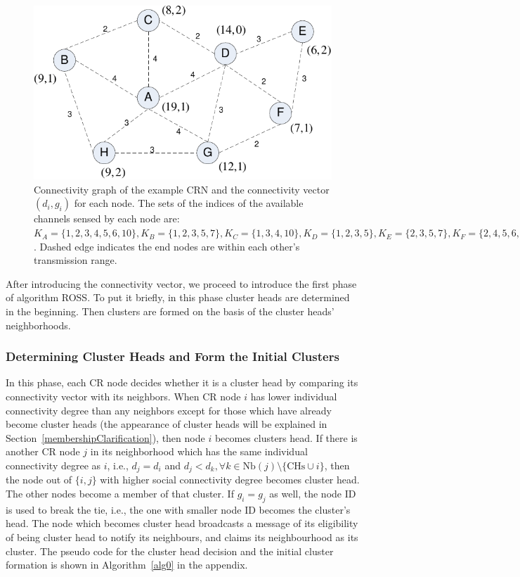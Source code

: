 \documentclass[10pt,journal,compsoc]{IEEEtran}
\theoremstyle{mytheoremstyle}
\theoremstyle{mytheoremstyle}
\theoremstyle{mytheoremstyle}
\newcommand{\ie}{i.e., }
\begin{document}
\begin{figure}[ht!]
  \centering
\includegraphics[width=0.7\linewidth]{figure1.pdf}
	\caption{Connectivity graph of the example CRN and the connectivity vector $(d_i, g_i)$ for each node. The sets of the indices of the available channels sensed by each node are: $K_A=\{1,2,3,4,5,6,10\}, K_B=\{1,2,3,5,7\}, K_C=\{1,3,4,10\}, K_D=\{1,2,3,5\}, K_E=\{2,3,5,7\}, K_F=\{2,4,5,6,7\}, K_G=\{1,2,3,4,8\}, K_H=\{1,2,5,8\}$. Dashed edge indicates the end nodes are within each other's transmission range.}
	\label{fig1}
\end{figure}

After introducing the connectivity vector, we proceed to introduce the first phase of algorithm ROSS.
To put it briefly, in this phase cluster heads are determined in the beginning. Then clusters are formed on the basis of the cluster heads' neighborhoods.


\subsubsection{Determining Cluster Heads and Form the Initial Clusters}
In this phase, each CR node decides whether it is a cluster head by comparing its connectivity vector with its neighbors.
When CR node $i$ has lower individual connectivity degree than any neighbors except for those which have already become cluster heads (the appearance of cluster heads will be explained in Section~\ref{membershipClarification}), then node $i$ becomes clusters head.
If there is another CR node $j$ in its neighborhood which has the same individual connectivity degree as $i$, \ie $d_j = d_i$ and $d_j < d_{k}, \forall k\in \text{Nb}(j)\setminus \{\text{CHs}\cup i\}$, then the node out of $\{i, j\}$ with higher social connectivity degree becomes cluster head. The other nodes become a member of that cluster. 
If $g_i = g_j$ as well, the node ID is used to break the tie, \ie the one with smaller node ID becomes the cluster's head.
%
The node which becomes cluster head broadcasts a message of its eligibility of being cluster head to notify its neighbours, and claims its neighbourhood as its cluster.
The pseudo code for the cluster head decision and the initial cluster formation is shown in Algorithm~\ref{alg0} in the appendix.
\end{document}
